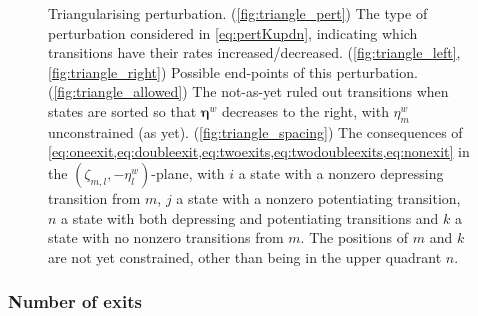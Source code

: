 \documentclass[12pt]{article}
\newcommand{\etwm}{\eta^w}
\newcommand{\etw}{\boldsymbol{\eta}^w}
\newcommand{\dgnm}{\zeta}
\begin{document}
\begin{figure}[ht]
\begin{center}
\begin{myenuma}
  \item \label{fig:triangle_spacing} 
\end{myenuma}
\caption[Triangularising perturbation]{Triangularising perturbation.
(\ref*{fig:triangle_pert}) The type of perturbation considered in \cref{eq:pertKupdn}, indicating which transitions have their rates increased/decreased.
(\ref*{fig:triangle_left},\ref*{fig:triangle_right}) Possible end-points of this perturbation. 
(\ref*{fig:triangle_allowed}) The not-as-yet ruled out transitions when states are sorted so that \(\etw\) decreases to the right, with \(\etwm_m\) unconstrained (as yet).
(\ref*{fig:triangle_spacing}) The consequences of \cref{eq:oneexit,eq:doubleexit,eq:twoexits,eq:twodoubleexits,eq:nonexit} in the \( (\dgnm_{m,l},-\etwm_l) \)-plane, with \(i\) a state with a nonzero depressing transition from \(m\), \(j\) a state with a nonzero potentiating transition, \(n\) a state with both depressing and potentiating transitions and \(k\) a state with no nonzero transitions from \(m\).
The positions of \(m\) and \(k\) are not yet constrained, other than being in the upper quadrant \wrt \(n\).
\label{fig:triangle_s}}
\end{center}
\end{figure}


\subsubsection{Number of exits}\label{sec:exit}
\end{document}
